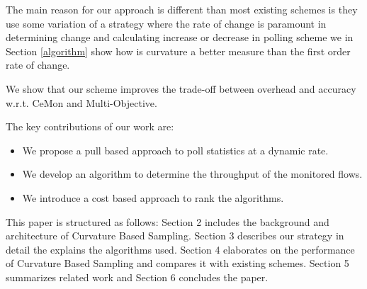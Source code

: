 The main reason for our approach is different than most existing schemes is they use some variation of a strategy where the rate of change is paramount
in determining change and calculating increase or decrease in polling scheme we in Section \ref{algorithm} show how is curvature a better measure than the first order rate of change.

We show that our scheme improves the trade-off between overhead and accuracy w.r.t. CeMon and Multi-Objective.

The key contributions of our work are:
\begin{itemize}
    \item We propose a pull based approach to poll statistics at a dynamic rate.
    \item We develop an algorithm to determine the throughput of the monitored flows.
    \item We introduce a cost based approach to rank the algorithms.
\end{itemize}

This paper is structured as follows:
Section 2 includes the background and architecture of Curvature Based Sampling.
Section 3 describes our strategy in detail the explains the algorithms used.
Section 4 elaborates on the performance of Curvature Based Sampling and compares it with existing schemes. 
Section 5 summarizes related work and Section 6 concludes the paper.
